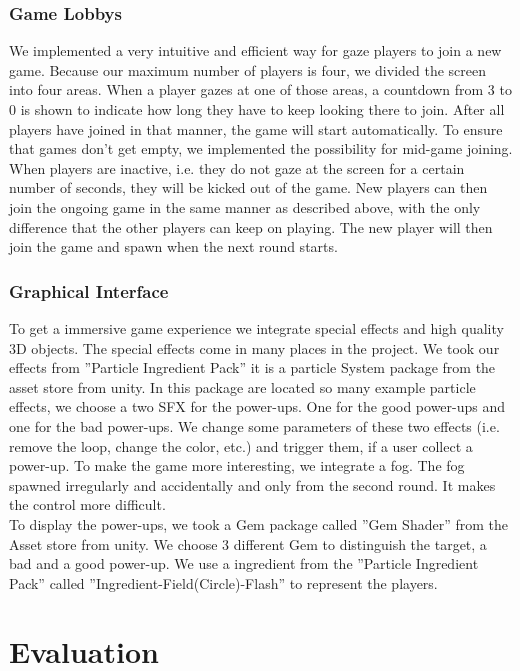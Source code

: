 \documentclass{sigchi}
\begin{document}
\subsubsection{Game Lobbys}
We implemented a very intuitive and efficient way for gaze players to join a new game. Because our maximum number of players is four, we divided the screen into four areas. When a player gazes at one of those areas, a countdown from 3 to 0 is shown to indicate how long they have to keep looking there to join. After all players have joined in that manner, the game will start automatically. To ensure that games don't get empty, we implemented the possibility for mid-game joining. When players are inactive, i.e. they do not gaze at the screen for a certain number of seconds, they will be kicked out of the game. New players can then join the ongoing game in the same manner as described above, with the only difference that the other players can keep on playing. The new player will then join the game and spawn when the next round starts.

\subsubsection{Graphical Interface} 
To get a immersive game experience we integrate special effects and high quality 3D objects. The special effects come in many places in the project. We took our effects from ''Particle Ingredient Pack'' it is a particle System package from the asset store from unity. In this package are located so many example particle effects, we choose a two SFX for the power-ups. One for the good power-ups and one for the bad power-ups. We change some parameters of these two effects (i.e. remove the loop, change the color, etc.) and trigger them, if a user collect a power-up. To make the game more interesting, we integrate a fog. The fog spawned irregularly and accidentally and only from the second round. It makes the control more difficult.\\
To display the power-ups, we took a Gem package called ''Gem Shader'' from the Asset store from unity. We choose 3 different Gem to distinguish the target, a bad and a good power-up. We use a ingredient from the ''Particle Ingredient Pack''  called ''Ingredient-Field(Circle)-Flash'' to represent the players. 


\section{Evaluation}
\end{document}
